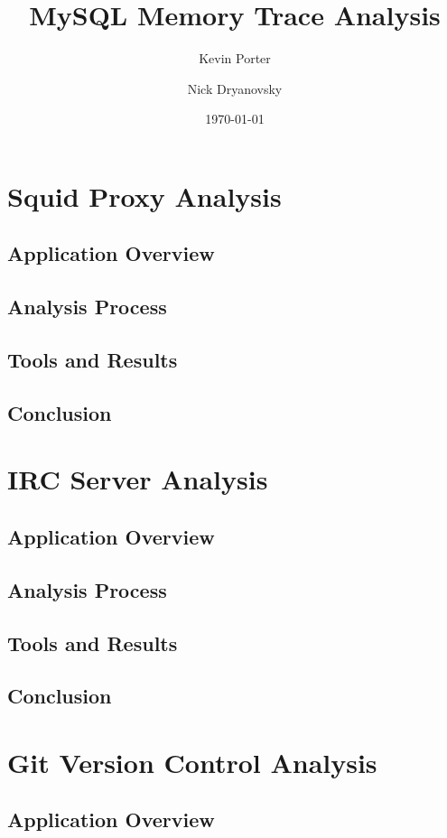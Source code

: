 \documentclass[11pt,a4paper, titlepage, oneside]{article}
\begin{document}
\title{MySQL Memory Trace Analysis}
\author{Kevin Porter \and Nick Dryanovsky}
\date{\today}
\maketitle

\setcounter{section}{-1}
\section{Squid Proxy Analysis}
\subsection{Application Overview}
\subsection{Analysis Process}
\subsection{Tools and Results}
\subsection{Conclusion}
\section{IRC Server Analysis}
\subsection{Application Overview}
\subsection{Analysis Process}
\subsection{Tools and Results}
\subsection{Conclusion}
\section{Git Version Control Analysis}
\subsection{Application Overview}
\end{document}
